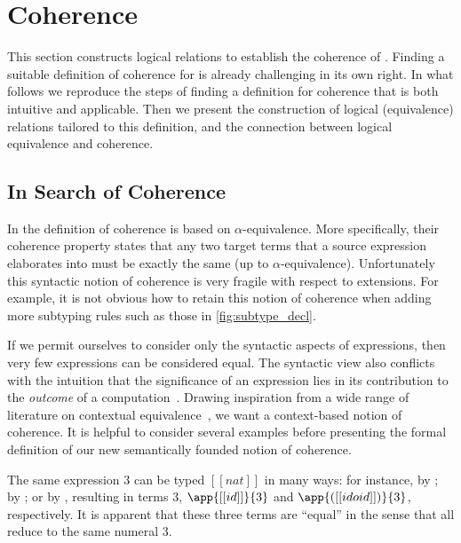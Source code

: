 
\section{Coherence}
\label{sec:cohe}

This section constructs logical relations to
establish the coherence of \name. Finding a
suitable definition of coherence for \name is already challenging in its own
right. In what follows we reproduce the steps of finding a definition for coherence
that is both intuitive and applicable. Then we present the
construction of logical (equivalence) relations tailored to this 
definition, and the connection between logical equivalence and coherence.



\subsection{In Search of Coherence}

In \oname the definition of coherence is based on
$\alpha$-equivalence. More specifically, their coherence property states that
any two target terms that a source expression elaborates into must be exactly the same (up to
$\alpha$-equivalence). Unfortunately this syntactic notion of coherence is
very fragile with respect to extensions.
For example, it is not obvious how to retain this notion of coherence when adding more subtyping
rules such as those in \cref{fig:subtype_decl}.

If we permit ourselves to consider only the syntactic aspects of expressions,
then very few expressions can be considered equal. The syntactic view also conflicts
with the intuition that the significance of an expression lies in its
contribution to the \textit{outcome} of a computation~\cite{Harper_2016}.
Drawing inspiration from a wide range of literature on contextual
equivalence~\cite{morris1969lambda}, we want a context-based notion of
coherence. It is helpful to consider several examples before presenting the
formal definition of our new semantically founded notion of coherence.

\begin{example} \label{eg:1}
The same \name expression $3$ can be typed $[[nat]]$ in many ways: for instance, by ; by
; or by , resulting in \tname
terms $3$, $\app{[[id]]}{3}$ and $\app{([[id o id]])}{3}$, respectively. It is apparent
that these three \tname terms are ``equal'' in the sense that all reduce to the
same numeral $3$.
\end{example}

